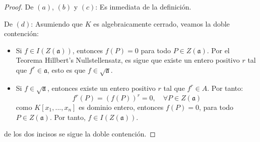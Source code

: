 \documentclass[12pt]{report}
\newcounter{it}
\theoremstyle{largebreak}
\newcommand{\fk}[1]{\ensuremath{\mathfrak{#1}}}
\begin{document}
    \begin{proof}
        De $(a)$, $(b)$ y $(c)$: Es inmediata de la definición.

        De $(d)$: Asumiendo que $K$ es algebraicamente cerrado, veamos la doble contención:
        \begin{itemize}
            \item Si $f\in I(Z(\fk{a}))$, entonces $f(P)=0$ para todo $P\in Z(\fk{a})$. Por el Teorema Hillbert's Nullstellensatz, es sigue que existe un entero positivo $r$ tal que $f^r\in\fk{a}$, esto es que $f\in\sqrt{\fk{a}}$.
            \item Si $f\in\sqrt{\fk{a}}$, entonces existe un entero positivo $r$ tal que $f^r\in A$. Por tanto:
            \begin{equation*}
                f^r(P)=\left(f(P)\right)^r=0,\quad\forall P\in Z(\fk{a})
            \end{equation*}
            como $K[x_1,...,x_n]$ es dominio entero, entonces $f(P)=0$, para todo $P\in Z(\fk{a})$. Por tanto, $f\in I(Z(\fk{a}))$.
        \end{itemize}
        de los dos incisos se sigue la doble contención.
        

\end{proof}
\end{document}
